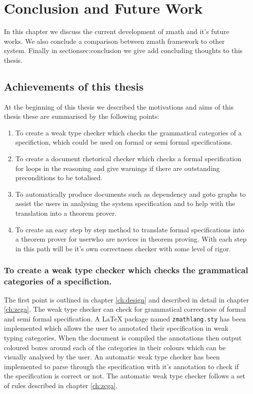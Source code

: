 \chapter{Conclusion and Future Work}
\label{ch:conclusion}

In this chapter we discuss the current development of \gls{zmath} and it's
future works. We also conclude a comparison between \gls{zmath} framework to
other system. Finally in section{sec:conclusion} we give add concluding thoughts
to this thesis.


\section{Achievements of this thesis}

At the beginning of this thesis we described the motivations and aims of this
thesis these are summarised by the following points:

\begin{enumerate}

\item To create a weak type checker which checks the grammatical categories of a
specifiction, which could be used on formal or semi formal specifications.

\item To create a document rhetorical checker which checks a formal
specification for loops in the reasoning and give warnings if there are
outstanding preconditions to be totalised.

\item To automatically produce documents such as dependency and goto graphs to
assist the users in analysing the system specification and to help with the
translation into a theorem prover.

\item To create an easy step by step method to translate formal specifications
into a theorem prover for userwho are novices in theorem proving. With each step
in this path will be it's own correctness checker with some level of rigor.

\end{enumerate}

\subsection{To create a weak type checker which checks the grammatical categories of a specifiction.}

The first point is outlined in chapter \ref{ch:design} and described in detail
in chapter \ref{ch:zcga}. The weak type checker can check for grammatical
correctness of formal and semi formal specification. A \LaTeX{} package named
\texttt{zmathlang.sty} has been implemented which allows the user to annotated
their specification in weak typing categories. When the document is compiled the
annotations then output coloured boxes around each of the categories in their
colours which can be visually analysed by the user. An automatic weak type
checker has been implemented to parse through the specification with it's
annotation to check if the specification is correct or not. The automatic weak
type checker follows a set of rules described in chapter \ref{ch:zcga}.

